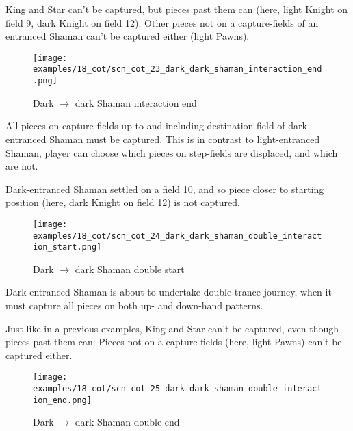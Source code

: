 King and Star can't be captured, but pieces past them can (here, light Knight on field 9,
dark Knight on field 12). Other pieces not on a capture-fields of an entranced Shaman can't
be captured either (light Pawns).

\clearpage %

\noindent
\begin{figure}[!h]
\texttt{[image: examples/18\_cot/scn\_cot\_23\_dark\_dark\_shaman\_interaction\_end.png]}
\caption{Dark $\rightarrow$ dark Shaman interaction end}
\label{fig:scn_cot_23_dark_dark_shaman_interaction_end}
\end{figure}

All pieces on capture-fields up-to and including destination field of dark-entranced Shaman
must be captured. This is in contrast to light-entranced Shaman, player can choose which
pieces on step-fields are displaced, and which are not.

Dark-entranced Shaman settled on a field 10, and so piece closer to starting position (here,
dark Knight on field 12) is not captured.

\clearpage %

\noindent
\begin{figure}[!h]
\texttt{[image: examples/18\_cot/scn\_cot\_24\_dark\_dark\_shaman\_double\_interaction\_start.png]}
\caption{Dark $\rightarrow$ dark Shaman double start}
\label{fig:scn_cot_24_dark_dark_shaman_double_interaction_start}
\end{figure}

Dark-entranced Shaman is about to undertake double trance-journey, when it must capture all
pieces on both up- and down-hand patterns.

Just like in a previous examples, King and Star can't be captured, even though pieces past
them can. Pieces not on a capture-fields (here, light Pawns) can't be captured either.

\clearpage %

\noindent
\begin{figure}[!h]
\texttt{[image: examples/18\_cot/scn\_cot\_25\_dark\_dark\_shaman\_double\_interaction\_end.png]}
\caption{Dark $\rightarrow$ dark Shaman double end}
\label{fig:scn_cot_25_dark_dark_shaman_double_interaction_end}
\end{figure}

